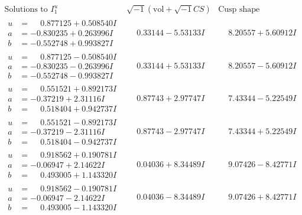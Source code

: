 \documentclass[1p]{elsarticle_modified}
\theoremstyle{definition}
\newcommand{\I}{\sqrt{-1}}
\begin{document}
$$\begin{array}{c|c|c}  
\text{Solutions to }I^u_{1}& \I (\text{vol} + \sqrt{-1}CS) & \text{Cusp shape}\\
 \hline 
\begin{aligned}
u &= \phantom{-}0.877125 + 0.508540 I \\
a &= -0.830235 + 0.263996 I \\
b &= -0.552748 + 0.993827 I\end{aligned}
 & \phantom{-}0.33144 - 5.53133 I & \phantom{-}8.20557 + 5.60912 I \\ \hline\begin{aligned}
u &= \phantom{-}0.877125 - 0.508540 I \\
a &= -0.830235 - 0.263996 I \\
b &= -0.552748 - 0.993827 I\end{aligned}
 & \phantom{-}0.33144 + 5.53133 I & \phantom{-}8.20557 - 5.60912 I \\ \hline\begin{aligned}
u &= \phantom{-}0.551521 + 0.892173 I \\
a &= -0.37219 + 2.31116 I \\
b &= \phantom{-}0.518404 + 0.942737 I\end{aligned}
 & \phantom{-}0.87743 + 2.97747 I & \phantom{-}7.43344 - 5.22549 I \\ \hline\begin{aligned}
u &= \phantom{-}0.551521 - 0.892173 I \\
a &= -0.37219 - 2.31116 I \\
b &= \phantom{-}0.518404 - 0.942737 I\end{aligned}
 & \phantom{-}0.87743 - 2.97747 I & \phantom{-}7.43344 + 5.22549 I \\ \hline\begin{aligned}
u &= \phantom{-}0.918562 + 0.190781 I \\
a &= -0.06947 + 2.14622 I \\
b &= \phantom{-}0.493005 + 1.143320 I\end{aligned}
 & \phantom{-}0.04036 + 8.34489 I & \phantom{-}9.07426 - 8.42771 I \\ \hline\begin{aligned}
u &= \phantom{-}0.918562 - 0.190781 I \\
a &= -0.06947 - 2.14622 I \\
b &= \phantom{-}0.493005 - 1.143320 I\end{aligned}
 & \phantom{-}0.04036 - 8.34489 I & \phantom{-}9.07426 + 8.42771 I \\ \hline\begin{aligned}

\end{aligned}
\end{array}$$
\end{document}
